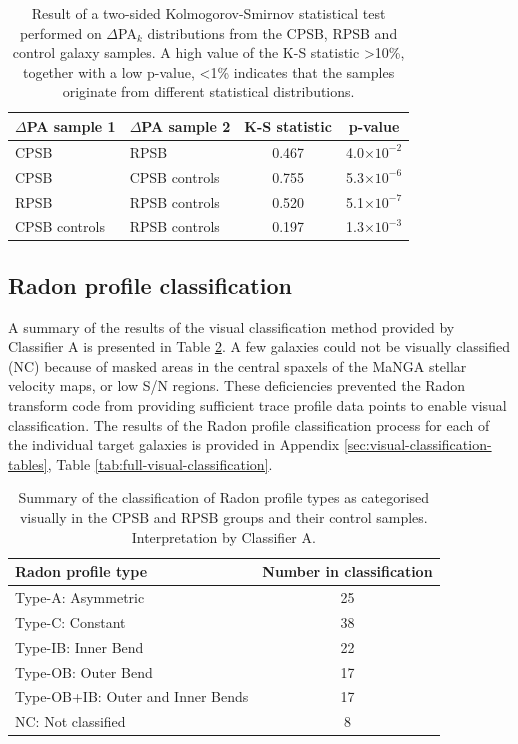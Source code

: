 \begin{table}
\caption[Kolmogorov-Smirnov statistical test of $\Delta$PA distributions]{Result of a two-sided Kolmogorov-Smirnov statistical test performed on $\Delta$PA$_{k}$ distributions from the CPSB, RPSB and control galaxy samples. A high value of the K-S statistic \textgreater 10\%, together with a low p-value, \textless 1\% indicates that the samples originate from different statistical distributions.}
\label{tab:K-S-tests}
\begin{tabular}{llcc}
\hline
$\Delta$PA sample 1  & $\Delta$PA sample 2 & K-S statistic & p-value \\
\hline
CPSB & RPSB & 0.467 & 4.0$\times10^{-2}$ \\
CPSB & CPSB controls & 0.755 & 5.3$\times10^{-6}$ \\
RPSB & RPSB controls & 0.520 & 5.1$\times10^{-7}$ \\
CPSB controls & RPSB controls & 0.197 & 1.3$\times10^{-3}$ \\
\hline
\end{tabular}
\end{table}

\subsection{Radon profile classification}
\label{sec:Radon-profile-classification}

A summary of the results of the visual classification method provided by Classifier A is presented in Table \ref{tab:Radon-class-summary}.  A few galaxies could not be visually classified (NC) because of masked areas in the central spaxels of the MaNGA stellar velocity maps, or low S/N regions. These deficiencies prevented the Radon transform code from providing sufficient trace profile data points to enable visual classification. The results of the Radon profile classification process for each of the individual target galaxies is provided in Appendix \ref{sec:visual-classification-tables}, Table \ref{tab:full-visual-classification}. 

\begin{table}
    \centering
    \caption[Summary of Radon profile type visual classifications]{Summary of the classification of Radon profile types as categorised visually in the CPSB and RPSB groups and their control samples. Interpretation by Classifier A.}
    \label{tab:Radon-class-summary}
    \begin{tabular}{lc}
    \hline
    Radon profile type & Number in classification \\
    \hline
    Type-A: Asymmetric & 25 \\
    Type-C: Constant & 38 \\
    Type-IB: Inner Bend & 22 \\
    Type-OB: Outer Bend & 17 \\
    Type-OB+IB: Outer and Inner Bends & 17 \\
    NC: Not classified & 8 \\
    \hline
    \end{tabular}
\end{table}

